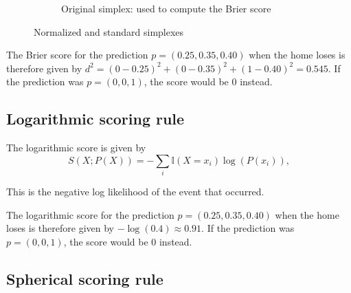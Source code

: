\documentclass[journal,article,accept,moreauthors,pdftex,12pt,a4paper]{mdpi}
\begin{document}
\begin{figure}[!ht]
\begin{subfigure}[b]{0.48\linewidth}


        \caption{Original simplex: used to compute the Brier score}
        \label{fig:B}
    \end{subfigure}
    \caption{Normalized and standard simplexes}
    \label{fig:norm_stand}
\end{figure}

The Brier score for the prediction $p=(0.25,0.35,0.40)$ when the home loses is therefore given by
$d^2=(0-0.25)^2+(0-0.35)^2+(1-0.40)^2=0.545$. If the prediction was
 $p=(0,0,1)$, the score would be 0 instead.



\subsection{Logarithmic scoring rule} 

The logarithmic  score is given by
$$S(X;P(X))=- \sum_{i}\mathbb{I}(X=x_i)\log(P(x_i)),$$

This is the negative log likelihood
of the event that occurred.

The logarithmic score for the prediction $p=(0.25,0.35,0.40)$ when the home loses is therefore given by
$-\log(0.4)\approx 0.91$. If the prediction was
 $p=(0,0,1)$, the score would be $0$ instead.


\subsection{Spherical scoring rule}
\end{document}
